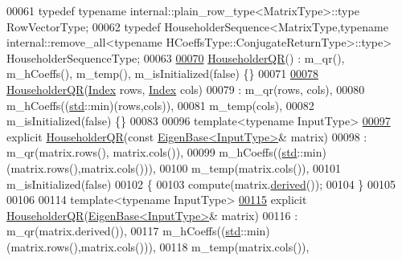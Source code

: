\begin{DoxyCode}
00061     \textcolor{keyword}{typedef} \textcolor{keyword}{typename} internal::plain\_row\_type<MatrixType>::type RowVectorType;
00062     \textcolor{keyword}{typedef} HouseholderSequence<MatrixType,typename internal::remove\_all<typename
       HCoeffsType::ConjugateReturnType>::type> HouseholderSequenceType;
00063 
\hyperlink{group___q_r___module_a974adb10a0e066057aeb3b360df68380}{00070}     \hyperlink{group___q_r___module_a974adb10a0e066057aeb3b360df68380}{HouseholderQR}() : m\_qr(), m\_hCoeffs(), m\_temp(), m\_isInitialized(false) \{\}
00071 
\hyperlink{group___q_r___module_a1087457610c53e1574de521a51de0cd3}{00078}     \hyperlink{group___q_r___module_a1087457610c53e1574de521a51de0cd3}{HouseholderQR}(\hyperlink{namespace_eigen_a62e77e0933482dafde8fe197d9a2cfde}{Index} rows, \hyperlink{namespace_eigen_a62e77e0933482dafde8fe197d9a2cfde}{Index} cols)
00079       : m\_qr(rows, cols),
00080         m\_hCoeffs((\hyperlink{namespacestd}{std}::min)(rows,cols)),
00081         m\_temp(cols),
00082         m\_isInitialized(false) \{\}
00083 
00096     \textcolor{keyword}{template}<\textcolor{keyword}{typename} InputType>
\hyperlink{group___q_r___module_afa7cfb4faa89195c4dc8d196924c8230}{00097}     \textcolor{keyword}{explicit} \hyperlink{group___q_r___module_afa7cfb4faa89195c4dc8d196924c8230}{HouseholderQR}(\textcolor{keyword}{const} \hyperlink{group___core___module_struct_eigen_1_1_eigen_base}{EigenBase<InputType>}& matrix)
00098       : m\_qr(matrix.rows(), matrix.cols()),
00099         m\_hCoeffs((\hyperlink{namespacestd}{std}::min)(matrix.rows(),matrix.cols())),
00100         m\_temp(matrix.cols()),
00101         m\_isInitialized(false)
00102     \{
00103       compute(matrix.\hyperlink{group___core___module_a324b16961a11d2ecfd2d1b7dd7946545}{derived}());
00104     \}
00105 
00106 
00114     \textcolor{keyword}{template}<\textcolor{keyword}{typename} InputType>
\hyperlink{group___q_r___module_a95a53f8479ee147d7b0ccab71c13e45d}{00115}     \textcolor{keyword}{explicit} \hyperlink{group___q_r___module_a95a53f8479ee147d7b0ccab71c13e45d}{HouseholderQR}(\hyperlink{group___core___module_struct_eigen_1_1_eigen_base}{EigenBase<InputType>}& matrix)
00116       : m\_qr(matrix.derived()),
00117         m\_hCoeffs((\hyperlink{namespacestd}{std}::min)(matrix.rows(),matrix.cols())),
00118         m\_temp(matrix.cols()),

\end{DoxyCode}
